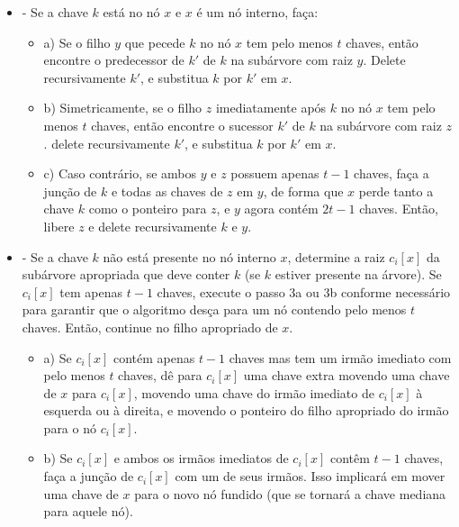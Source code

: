 \documentclass[a4paper, 12pt]{article}
\begin{document}
\begin{itemize}

\item {} - Se a chave $k$ está no nó $x$ e $x$ é um nó interno, faça:

\begin{itemize}
\item a) Se o filho $y$ que pecede $k$ no nó $x$ tem pelo menos $t$ chaves, então encontre o predecessor de $k'$ de $k$ na subárvore com raiz $y$. Delete recursivamente $k'$, e substitua $k$ por $k'$ em $x$.

\item b) Simetricamente, se o filho $z$ imediatamente após $k$ no nó $x$ tem pelo menos $t$ chaves, então encontre o sucessor $k'$ de $k$ na subárvore com raiz $z$. delete recursivamente $k'$, e substitua $k$ por $k'$ em $x$.

\item c) Caso contrário, se ambos $y$ e $z$ possuem apenas $t-1$ chaves, faça a junção de $k$ e todas as chaves de $z$ em $y$, de forma que $x$ perde tanto a chave $k$ como o ponteiro para $z$, e $y$ agora contém $2t-1$ chaves. Então, libere $z$ e delete recursivamente $k$ e $y$.
\end{itemize}

\item {} - Se a chave $k$ não está presente no nó interno $x$, determine a raiz $c_{i}[x]$ da subárvore apropriada que deve conter $k$ (se $k$ estiver presente na árvore). Se $c_{i}[x]$ tem apenas $t-1$ chaves, execute o passo 3a ou 3b conforme necessário para garantir que o algoritmo desça para um nó contendo pelo menos $t$ chaves. Então, continue no filho apropriado de $x$.

\begin{itemize}
\item a) Se $c_{i}[x]$ contém apenas $t-1$ chaves mas tem um irmão imediato com pelo menos $t$ chaves, dê para $c_{i}[x]$ uma chave extra movendo uma chave de $x$ para $c_{i}[x]$, movendo uma chave do irmão imediato de $c_{i}[x]$ à esquerda ou à direita, e movendo o ponteiro do filho apropriado do irmão para o nó $c_{i}[x]$.

\item b) Se $c_{i}[x]$ e ambos os irmãos imediatos de $c_{i}[x]$ contêm $t-1$ chaves, faça a junção de $c_{i}[x]$ com um de seus irmãos. Isso implicará em mover uma chave de $x$ para o novo nó fundido (que se tornará a chave mediana para aquele nó).
\end{itemize}


\end{itemize}
\end{document}
